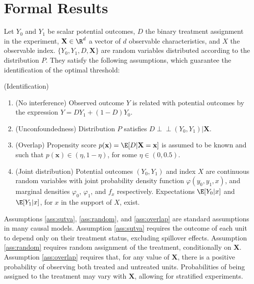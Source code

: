 {\section{Formal Results} \label{sec:formal}
Let $Y_0$ and $Y_1$ be scalar potential outcomes, $D$ the binary treatment assignment in the experiment, $\textbf{X} \in \R^d$ a vector of $d$ observable characteristics, and $X$ the observable index. $\{Y_0,Y_1, D, \textbf{X}\}$ are random variables distributed according to the distribution $P$. They satisfy the following assumptions, which guarantee the identification of the optimal threshold:

\begin{ass} \label{ass:identification}
{\normalfont (Identification)} 
\begin{enumerate}[label=1.\arabic*]
\item \label{ass:sutva}
    {\normalfont (No interference)} Observed outcome $Y$ is related with potential outcomes by the expression $Y= DY_1 + (1-D)Y_0$.
\item \label{ass:random}
    {\normalfont (Unconfoundedness)} Distribution $P$ satisfies $D \perp\!\!\!\perp (Y_0,Y_1) |\textbf{X}$.
\item \label{ass:overlap}
    {\normalfont (Overlap)} Propensity score $p(\textbf{x})=\E[D|\textbf{X}=\textbf{x}]$ is assumed to be known and such that $p(\textbf{x}) \in (\eta,1-\eta)$, for some $\eta \in (0,0.5)$.
\item \label{ass:jointdist}
    {\normalfont (Joint distribution)} Potential outcomes $(Y_0, Y_1)$ and index $X$ are continuous random variables with joint probability density function $\varphi (y_0,y_1,x)$, and marginal densities $\varphi_0$, $\varphi_1$, and $f_x$ respectively. Expectations $\E[Y_0|x]$ and $\E[Y_1|x]$, for $x$ in the support of $X$, exist.
\end{enumerate}
\end{ass}

Assumptions \ref{ass:sutva}, \ref{ass:random}, and \ref{ass:overlap} are standard assumptions in many causal models. Assumption \ref{ass:sutva} requires the outcome of each unit to depend only on their treatment status, excluding spillover effects. Assumption \ref{ass:random} requires random assignment of the treatment, conditionally on $\textbf{X}$. Assumption \ref{ass:overlap} requires that, for any value of $\textbf{X}$, there is a positive probability of observing both treated and untreated units. Probabilities of being assigned to the treatment may vary with $\textbf{X}$, allowing for stratified experiments.

}
